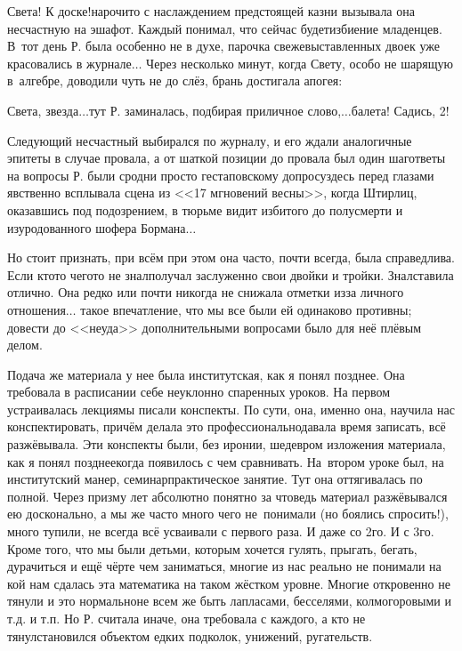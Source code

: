 \diagdash Света! К доске!\mdash нарочито с наслаждением предстоящей казни вызывала она несчастную на эшафот. Каждый понимал, что сейчас будет\mdash избиение младенцев. В~тот день Р. была особенно не в духе, парочка свежевыставленных двоек уже красовались в журнале$\ldots$ Через несколько минут, когда Свету, особо не шарящую в~алгебре, доводили чуть не до слёз, брань достигала апогея:

\diagdash Света, звезда$\ldots$\mdash тут Р. заминалась, подбирая приличное слово,\mdash $\ldots$балета! Садись, 2!

Следующий несчастный выбирался по журналу, и его ждали аналогичные эпитеты в случае провала, а от шаткой позиции до провала был один шаг\mdash ответы на вопросы Р. были сродни просто гестаповскому допросу\mdash здесь перед глазами явственно всплывала сцена из <<17 мгновений весны>>, когда Штирлиц, оказавшись под подозрением, в тюрьме видит избитого до полусмерти и изуродованного шофера Бормана$\ldots$

Но стоит признать, при всём при этом она часто, почти всегда, была справедлива. Если кто\sdash то чего\sdash то не знал\mdash получал заслуженно свои двойки и тройки. Знал\mdash ставила отлично. Она редко или почти никогда не снижала отметки из\sdash за личного отношения$\ldots$ такое впечатление, что мы все были ей одинаково противны; довести до <<неуда>> дополнительными вопросами было для неё плёвым делом. 

Подача же материала у нее была институтская, как я понял позднее. Она требовала в расписании себе неуклонно спаренных уроков. На первом устраивалась лекция\mdash мы писали конспекты. По сути, она, именно она, научила нас конспектировать, причём делала это профессионально\mdash давала время записать, всё разжёвывала. Эти конспекты были, без иронии, шедевром изложения материала, как я понял позднее\mdash когда появилось с чем сравнивать. На~втором уроке был, на институтский манер, семинар\mdash практическое занятие. Тут она оттягивалась по полной. Через призму лет абсолютно понятно за что\mdash ведь материал разжёвывался ею досконально, а мы же часто много чего не~понимали (но боялись спросить!), много тупили, не всегда всё усваивали с  первого раза. И даже со 2\sdash го. И с 3\sdash го. Кроме того, что мы были детьми, которым хочется гулять, прыгать, бегать, дурачиться и ещё чёрте чем заниматься, многие из нас реально не понимали на кой нам сдалась эта математика на таком жёстком уровне. Многие откровенно не тянули и это нормально\mdash не всем же быть лапласами, бесселями, колмогоровыми и т.д. и т.п. Но Р. считала иначе, она требовала с каждого, а кто не тянул\mdash становился объектом едких подколок, унижений, ругательств.

